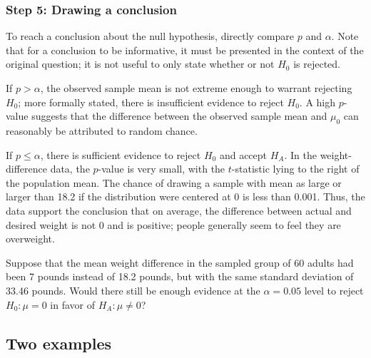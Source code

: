 \subsubsection{Step 5: Drawing a conclusion}

To reach a conclusion about the null hypothesis, directly compare $p$ and $\alpha$. Note that for a conclusion to be informative, it must be presented in the context of the original question; it is not useful to only state whether or not $H_0$ is rejected.

If $p > \alpha$, the observed sample mean is not extreme enough to warrant rejecting $H_0$; more formally stated, there is insufficient evidence to reject $H_0$. A high $p$-value suggests that the difference between the observed sample mean and $\mu_0$ can reasonably be attributed to random chance.

If $p \leq \alpha$, there is sufficient evidence to reject $H_0$ and accept $H_A$. In the  weight-difference data, the $p$-value is very small, with the $t$-statistic lying to the right of the population mean. The chance of drawing a sample with mean as large or larger than 18.2 if the distribution were centered at 0 is less than 0.001. Thus, the data support the conclusion that on average, the difference between actual and desired weight is  not 0 and is positive; people generally seem to feel they are overweight.

\begin{exercisewrap}
\begin{nexercise}
Suppose that the mean weight difference in the sampled group of 60 adults had been 7 pounds instead of 18.2 pounds, but with the same standard deviation of 33.46 pounds. Would there still be enough evidence at the $\alpha = 0.05$ level to reject $H_0: \mu = 0$ in favor of $H_A: \mu \neq 0$?\footnotemark{}
\end{nexercise}
\end{exercisewrap}


\textD{\newpage}


\subsection{Two examples\vspace{-3mm}}

